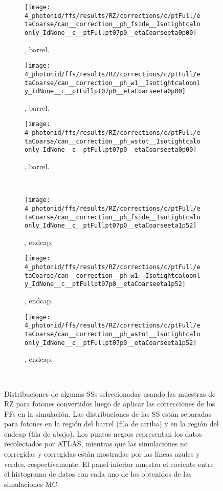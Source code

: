 \begin{figure}[ht!]
    \centering
    \begin{subfigure}[h]{0.32\linewidth}
        \centering
        \texttt{[image: 4\_photonid/ffs/results/RZ/corrections/c/ptFull/etaCoarse/can\_\_correction\_\_ph\_fside\_\_Isotightcaloonly\_IdNone\_\_c\_\_ptFullpt07p0\_\_etaCoarseeta0p00]}
        \caption{\fside, barrel.}
    \end{subfigure}
    \hfill
    \begin{subfigure}[h]{0.32\linewidth}
        \centering
        \texttt{[image: 4\_photonid/ffs/results/RZ/corrections/c/ptFull/etaCoarse/can\_\_correction\_\_ph\_w1\_\_Isotightcaloonly\_IdNone\_\_c\_\_ptFullpt07p0\_\_etaCoarseeta0p00]}
        \caption{\wone, barrel.}
    \end{subfigure}
    \hfill
    \begin{subfigure}[h]{0.32\linewidth}
        \centering
        \texttt{[image: 4\_photonid/ffs/results/RZ/corrections/c/ptFull/etaCoarse/can\_\_correction\_\_ph\_wstot\_\_Isotightcaloonly\_IdNone\_\_c\_\_ptFullpt07p0\_\_etaCoarseeta0p00]}
        \caption{\wstot, barrel.}
    \end{subfigure}\\
    \begin{subfigure}[h]{0.32\linewidth}
        \centering
        \texttt{[image: 4\_photonid/ffs/results/RZ/corrections/c/ptFull/etaCoarse/can\_\_correction\_\_ph\_fside\_\_Isotightcaloonly\_IdNone\_\_c\_\_ptFullpt07p0\_\_etaCoarseeta1p52]}
        \caption{\fside, endcap.}
    \end{subfigure}
    \hfill
    \begin{subfigure}[h]{0.32\linewidth}
        \centering
        \texttt{[image: 4\_photonid/ffs/results/RZ/corrections/c/ptFull/etaCoarse/can\_\_correction\_\_ph\_w1\_\_Isotightcaloonly\_IdNone\_\_c\_\_ptFullpt07p0\_\_etaCoarseeta1p52]}
        \caption{\wone, endcap.}
    \end{subfigure}
    \hfill
    \begin{subfigure}[h]{0.32\linewidth}
        \centering
        \texttt{[image: 4\_photonid/ffs/results/RZ/corrections/c/ptFull/etaCoarse/can\_\_correction\_\_ph\_wstot\_\_Isotightcaloonly\_IdNone\_\_c\_\_ptFullpt07p0\_\_etaCoarseeta1p52]}
        \caption{\wstot, endcap.}
    \end{subfigure}\\
    \caption{Distribuciones de algunas \acp{SS} seleccionadas usando las muestras de \ac{RZ} para fotones convertidos luego de aplicar las correcciones de los \acp{FF} en la simulación. Las distribuciones de las \ac{SS} están separadas para fotones en la región del barrel (fila de arriba) y en la región del endcap (fila de abajo). Los puntos negros representan los datos recolectados por \ac{ATLAS}, mientras que las simulaciones no corregidas y corregidas están mostradas por las líneas azules y verdes, respectivamente. El panel inferior muestra el cociente entre el histograma de datos con cada uno de los obtenidos de las simulaciones \ac{MC}.}
    \label{fig:ss_corrections:ffs:results:ss_rz}
\end{figure}

